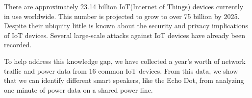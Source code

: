 There are approximately 23.14 billion IoT(Internet of Things) devices currently in use worldwide. This number is projected to grow to over 75 billion by 2025. Despite their ubiquity little is known about the security and privacy implications of IoT devices. Several large-scale attacks against IoT devices have already been recorded.

To help address this knowledge gap, we have collected a year’s worth of network traffic and power data from 16 common IoT devices. From this data, we show that we can identify different smart speakers, like the Echo Dot, from analyzing one minute of power data on a shared power line.